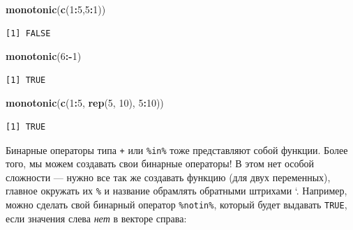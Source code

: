 \documentclass[
]{book}
\newenvironment{Shaded}{\begin{snugshade}}{\end{snugshade}}
\newcommand{\ControlFlowTok}[1]{\textcolor[rgb]{0.13,0.29,0.53}{\textbf{#1}}}
\newcommand{\DataTypeTok}[1]{\textcolor[rgb]{0.13,0.29,0.53}{#1}}
\newcommand{\DecValTok}[1]{\textcolor[rgb]{0.00,0.00,0.81}{#1}}
\newcommand{\KeywordTok}[1]{\textcolor[rgb]{0.13,0.29,0.53}{\textbf{#1}}}
\newcommand{\NormalTok}[1]{#1}
\newcommand{\OperatorTok}[1]{\textcolor[rgb]{0.81,0.36,0.00}{\textbf{#1}}}
\newcommand{\StringTok}[1]{\textcolor[rgb]{0.31,0.60,0.02}{#1}}
\begin{document}
\begin{Shaded}
\begin{Highlighting}[]
\KeywordTok{monotonic}\NormalTok{(}\KeywordTok{c}\NormalTok{(}\DecValTok{1}\OperatorTok{:}\DecValTok{5}\NormalTok{,}\DecValTok{5}\OperatorTok{:}\DecValTok{1}\NormalTok{))}
\end{Highlighting}
\end{Shaded}

\begin{verbatim}
[1] FALSE
\end{verbatim}

\begin{Shaded}
\begin{Highlighting}[]
\KeywordTok{monotonic}\NormalTok{(}\DecValTok{6}\OperatorTok{:-}\DecValTok{1}\NormalTok{)}
\end{Highlighting}
\end{Shaded}

\begin{verbatim}
[1] TRUE
\end{verbatim}

\begin{Shaded}
\begin{Highlighting}[]
\KeywordTok{monotonic}\NormalTok{(}\KeywordTok{c}\NormalTok{(}\DecValTok{1}\OperatorTok{:}\DecValTok{5}\NormalTok{, }\KeywordTok{rep}\NormalTok{(}\DecValTok{5}\NormalTok{, }\DecValTok{10}\NormalTok{), }\DecValTok{5}\OperatorTok{:}\DecValTok{10}\NormalTok{))}
\end{Highlighting}
\end{Shaded}

\begin{verbatim}
[1] TRUE
\end{verbatim}

Бинарные операторы типа \texttt{+} или \texttt{\%in\%} тоже представляют собой функции. Более того, мы можем создавать свои бинарные операторы! В этом нет особой сложности --- нужно все так же создавать функцию (для двух переменных), главное окружать их \texttt{\%} и название обрамлять обратными штрихами `. Например, можно сделать свой бинарный оператор \texttt{\%notin\%}, который будет выдавать \texttt{TRUE}, если значения слева \emph{нет} в векторе справа:

\begin{Shaded}
\end{Shaded}
\end{document}
